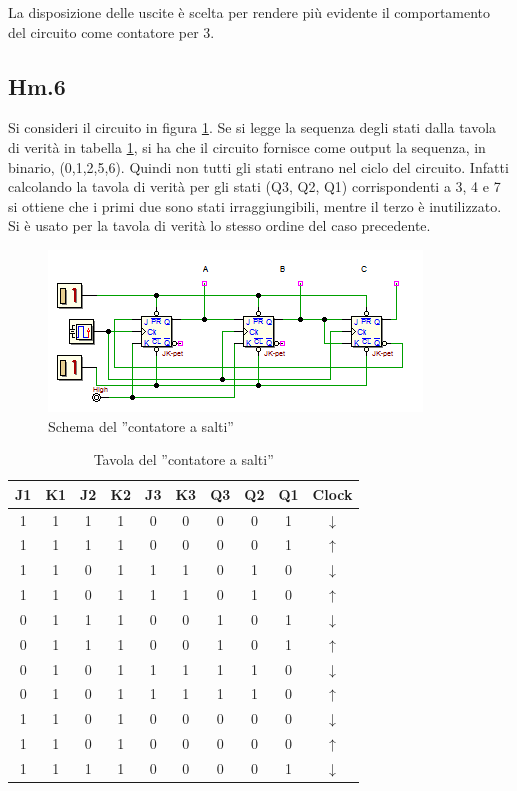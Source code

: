 \documentclass[journal, a4paper]{IEEEtran}
\begin{document}
La disposizione delle uscite è scelta per rendere più evidente il comportamento del circuito come contatore per 3.

\subsection{Hm.6}

Si consideri il circuito in figura \ref{fig:contcazzodicane}. Se si legge la sequenza degli stati dalla tavola di verità in tabella \ref{tab:countcazzodicane}, si ha che il circuito fornisce come output la sequenza, in binario, (0,1,2,5,6). Quindi non tutti gli stati entrano nel ciclo del circuito. Infatti calcolando la tavola di verità per gli stati (Q3, Q2, Q1) corrispondenti a 3, 4 e 7 si ottiene che i primi due sono stati irraggiungibili, mentre il terzo è inutilizzato. Si è usato per la tavola di verità lo stesso ordine del caso precedente.

\begin{figure}[htp]
\centering
\includegraphics[scale=.8]{hm6}
\caption{Schema del ''contatore a salti''}
\label{fig:contcazzodicane}
\end{figure}

\begin{table}[htp]
\centering
\caption{Tavola del ''contatore a salti''}
\label{tab:countcazzodicane}
\begin{tabular}{|c|c|c|c|c|c|c|c|c|c|}
\hline
J1 & K1 & J2 & K2 & J3 & K3 & Q3 & Q2 & Q1 & Clock \\ 
\hline 
1 & 1 & 1 & 1 & 0 & 0 & 0 & 0 & 1 & $\downarrow$ \\ 
\hline 
1 & 1 & 1 & 1 & 0 & 0 & 0 & 0 & 1 & $\uparrow$ \\ 
\hline 
1 & 1 & 0 & 1 & 1 & 1 & 0 & 1 & 0 & $\downarrow$ \\ 
\hline 
1 & 1 & 0 & 1 & 1 & 1 & 0 & 1 & 0 & $\uparrow$ \\ 
\hline
0 & 1 & 1 & 1 & 0 & 0 & 1 & 0 & 1 & $\downarrow$ \\ 
\hline 
0 & 1 & 1 & 1 & 0 & 0 & 1 & 0 & 1 & $\uparrow$ \\ 
\hline
0 & 1 & 0 & 1 & 1 & 1 & 1 & 1 & 0 & $\downarrow$ \\ 
\hline 
0 & 1 & 0 & 1 & 1 & 1 & 1 & 1 & 0 & $\uparrow$ \\ 
\hline 
1 & 1 & 0 & 1 & 0 & 0 & 0 & 0 & 0 & $\downarrow$ \\ 
\hline 
1 & 1 & 0 & 1 & 0 & 0 & 0 & 0 & 0 & $\uparrow$ \\ 
\hline
1 & 1 & 1 & 1 & 0 & 0 & 0 & 0 & 1 & $\downarrow$ \\ 
\hline
\end{tabular} 
\end{table}
\end{document}
